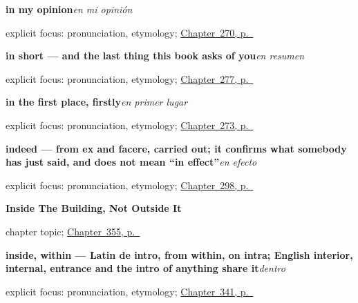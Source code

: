 \noindent\begin{minipage}[t]{\linewidth}
\raggedright
\textbf{in my opinion}\enspace\emph{en mi opinión}\par
\footnotesize explicit focus: pronunciation, etymology; \hyperref[ch:argumentar]{Chapter~270, p.~\pageref*{ch:argumentar}}
\end{minipage}\par\smallskip

\noindent\begin{minipage}[t]{\linewidth}
\raggedright
\textbf{in short — and the last thing this book asks of you}\enspace\emph{en resumen}\par
\footnotesize explicit focus: pronunciation, etymology; \hyperref[ch:fuentes]{Chapter~277, p.~\pageref*{ch:fuentes}}
\end{minipage}\par\smallskip

\noindent\begin{minipage}[t]{\linewidth}
\raggedright
\textbf{in the first place, firstly}\enspace\emph{en primer lugar}\par
\footnotesize explicit focus: pronunciation, etymology; \hyperref[ch:parrafo]{Chapter~273, p.~\pageref*{ch:parrafo}}
\end{minipage}\par\smallskip

\noindent\begin{minipage}[t]{\linewidth}
\raggedright
\textbf{indeed — from ex and facere, carried out; it confirms what somebody has just said, and does not mean \textquotedblleft{}in effect\textquotedblright{}}\enspace\emph{en efecto}\par
\footnotesize explicit focus: pronunciation, etymology; \hyperref[ch:mas-respuestas]{Chapter~298, p.~\pageref*{ch:mas-respuestas}}
\end{minipage}\par\smallskip

\noindent\begin{minipage}[t]{\linewidth}
\raggedright
\textbf{Inside The Building, Not Outside It}\par
\footnotesize chapter topic; \hyperref[ch:la-pared-y-el-techo]{Chapter~355, p.~\pageref*{ch:la-pared-y-el-techo}}
\end{minipage}\par\smallskip

\noindent\begin{minipage}[t]{\linewidth}
\raggedright
\textbf{inside, within — Latin de intro, from within, on intra; English interior, internal, entrance and the intro of anything share it}\enspace\emph{dentro}\par
\footnotesize explicit focus: pronunciation, etymology; \hyperref[ch:arriba-y-abajo]{Chapter~341, p.~\pageref*{ch:arriba-y-abajo}}
\end{minipage}\par\smallskip

